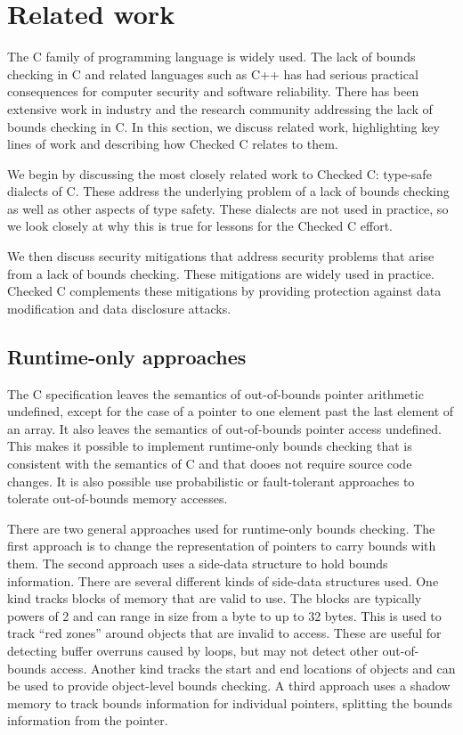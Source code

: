 
\chapter{Related work}
\label{chapter:lessons}

The C family of programming language is widely used.  The lack of
bounds checking in C and related languages such as C++ has had
serious practical consequences for computer security and software 
reliability.   There has been extensive work in industry and the
research community addressing the lack of bounds checking in C.
In this section, we discuss related work,  
highlighting key lines of work and describing how Checked C relates to them. 

We begin by discussing the most closely related work to Checked C:
type-safe dialects of C.  These address the underlying problem of
a lack of bounds checking as well as other aspects of type safety.
These dialects are not used in practice, so we look closely at why
this is true for lessons for the Checked C effort.

We then discuss security mitigations that address
security problems that arise from a lack of bounds checking.
These mitigations are widely used in practice.   Checked C
complements these mitigations by providing protection against data
modification and data disclosure attacks.

\section{Runtime-only approaches}

The C specification leaves the semantics of out-of-bounds pointer
arithmetic undefined, except for the case of a pointer to one element
past the last element of an array.  It also leaves the semantics of out-of-bounds
pointer access undefined.  This makes it possible to implement
runtime-only bounds checking that is consistent with the semantics of
C and that dooes not require source code changes.   It is also possible
use probabilistic or fault-tolerant approaches to tolerate out-of-bounds
memory accesses.

There are two general approaches used 
for runtime-only bounds checking.
The first approach is to change the representation of pointers to carry
bounds with them.  The second approach uses a side-data structure to
hold bounds information.   There are several different kinds of side-data
structures used.  One kind tracks blocks of memory that are valid to
use.  The blocks are typically powers of 2 and can range in size
from a byte to up to 32 bytes. This is used to track ``red zones'' around objects that
are invalid to access.  These are useful for detecting buffer overruns caused
by loops, but may not detect other out-of-bounds access.  Another kind tracks the
start and end locations of objects and can be used to provide object-level bounds checking.   A third approach uses a shadow memory to track bounds information for individual pointers, splitting the bounds information from the pointer.

